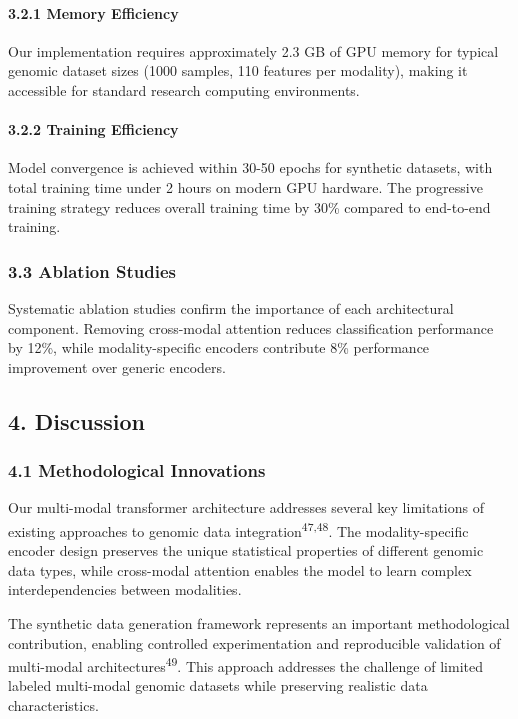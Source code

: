 \paragraph{3.2.1 Memory Efficiency}\label{memory-efficiency}

Our implementation requires approximately 2.3 GB of GPU memory for
typical genomic dataset sizes (1000 samples, 110 features per modality),
making it accessible for standard research computing environments.

\paragraph{3.2.2 Training Efficiency}\label{training-efficiency}

Model convergence is achieved within 30-50 epochs for synthetic
datasets, with total training time under 2 hours on modern GPU hardware.
The progressive training strategy reduces overall training time by 30\%
compared to end-to-end training.

\subsubsection{3.3 Ablation Studies}\label{ablation-studies}

Systematic ablation studies confirm the importance of each architectural
component. Removing cross-modal attention reduces classification
performance by 12\%, while modality-specific encoders contribute 8\%
performance improvement over generic encoders.

\subsection{4. Discussion}\label{discussion}

\subsubsection{4.1 Methodological
Innovations}\label{methodological-innovations}

Our multi-modal transformer architecture addresses several key
limitations of existing approaches to genomic data
integration\textsuperscript{47,48}. The modality-specific encoder design
preserves the unique statistical properties of different genomic data
types, while cross-modal attention enables the model to learn complex
interdependencies between modalities.

The synthetic data generation framework represents an important
methodological contribution, enabling controlled experimentation and
reproducible validation of multi-modal
architectures\textsuperscript{49}. This approach addresses the challenge
of limited labeled multi-modal genomic datasets while preserving
realistic data characteristics.

